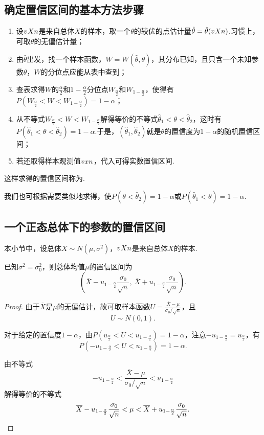 \subsection{确定置信区间的基本方法步骤}
\begin{enumerate}
\item 设\(v{X}{n}\)是来自总体\(X\)的样本，取一个\(\theta\)的较优的点估计量\(\hat{\theta}=\hat{\theta}(v{X}{n})\).习惯上，可取\(\theta\)的无偏估计量；
\item 由\(\hat{\theta}\)出发，找一个样本函数，\(W=W(\hat{\theta},\theta)\)，其分布已知，且只含一个未知参数\(\theta\)，\(W\)的分位点应能从表中查到；
\item 查表求得\(W\)的\(\frac{\alpha}{2}\)和\(1-\frac{\alpha}{2}\)分位点\(W_{\frac{\alpha}{2}}\)和\(W_{1-\frac{\alpha}{2}}\)，使得有\(P(W_{\frac{\alpha}{2}}<W<W_{1-\frac{\alpha}{2}})=1-\alpha\)；
\item 从不等式\(W_{\frac{\alpha}{2}}<W<W_{1-\frac{\alpha}{2}}\)解得等价的不等式\(\hat{\theta}_1 < \theta < \hat{\theta}_2\)，这时有\(P(\hat{\theta}_1 < \theta < \hat{\theta}_2) = 1-\alpha\).于是，\((\hat{\theta}_1,\hat{\theta}_2)\)就是\(\theta\)的置信度为\(1-\alpha\)的随机置信区间；
\item 若还取得样本观测值\(v{x}{n}\)，代入可得实数置信区间.
\end{enumerate}

这样求得的置信区间称为.

我们也可根据需要类似地求得，使\(P(\theta<\hat{\theta}_2)=1-\alpha\)或\(P(\hat{\theta}_1<\theta)=1-\alpha\).

\subsection{一个正态总体下的参数的置信区间}
本小节中，设总体\(X \sim N(\mu,\sigma^2)\)，\(v{X}{n}\)是来自总体\(X\)的样本.
\begin{example}
已知\(\sigma^2=\sigma_0^2\)，则总体均值\(\mu\)的置信区间为\[
\left( \overline{X} - u_{1-\frac{\alpha}{2}} \frac{\sigma_0}{\sqrt{n}},\ \overline{X} + u_{1-\frac{\alpha}{2}} \frac{\sigma_0}{\sqrt{n}} \right).
\]
\begin{proof}
\def\U{\frac{\overline{X}-\mu}{\sigma_0 / \sqrt{n}}}
由于\(\overline{X}\)是\(\mu\)的无偏估计，故可取样本函数\(U=\U\)，且\[
U \sim N(0,1).
\]

对于给定的置信度\(1-\alpha\)，由\(P(u_{\frac{\alpha}{2}} < U < u_{1-\frac{\alpha}{2}})=1-\alpha\)，注意\(-u_{1-\frac{\alpha}{2}} = u_{\frac{\alpha}{2}}\)，有\[
P(-u_{1-\frac{\alpha}{2}} < U < u_{1-\frac{\alpha}{2}}) = 1-\alpha.
\]

由不等式\[
-u_{1-\frac{\alpha}{2}} < \U < u_{1-\frac{\alpha}{2}}
\]解得等价的不等式\[
\overline{X} - u_{1-\frac{\alpha}{2}} \frac{\sigma_0}{\sqrt{n}} < \mu < \overline{X} + u_{1-\frac{\alpha}{2}} \frac{\sigma_0}{\sqrt{n}}.
\qedhere
\]
\end{proof}
\end{example}

